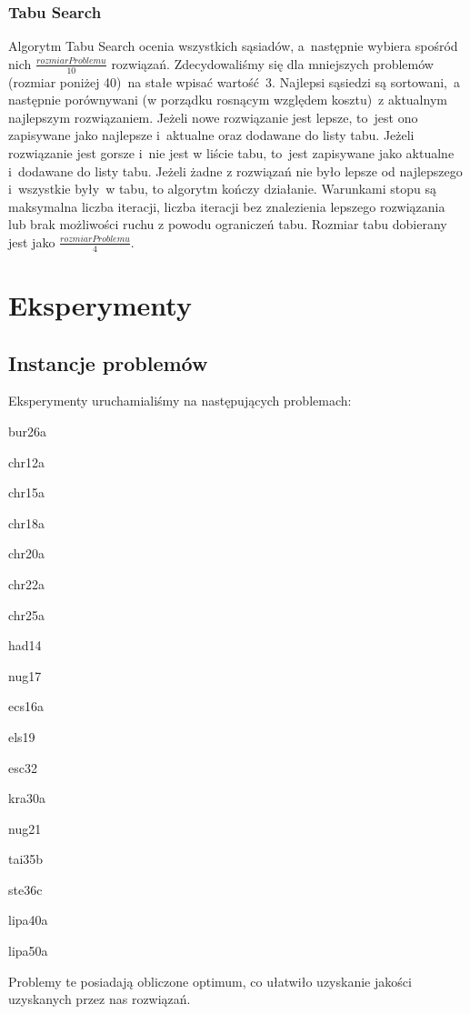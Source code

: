 \documentclass[a4paper,10pt]{article}
\begin{document}
\subsubsection{Tabu Search}
Algorytm Tabu Search ocenia wszystkich sąsiadów, a~następnie wybiera spośród nich $\frac{rozmiarProblemu}{10}$ rozwiązań. 
Zdecydowaliśmy się dla mniejszych problemów (rozmiar poniżej 40)~na stałe wpisać wartość~3.
Najlepsi sąsiedzi są sortowani,~a następnie porównywani (w porządku rosnącym względem kosztu)~z aktualnym najlepszym rozwiązaniem.
Jeżeli nowe rozwiązanie jest lepsze, to~jest ono zapisywane jako najlepsze i~aktualne oraz dodawane do listy tabu.
Jeżeli rozwiązanie jest gorsze i~nie jest w liście tabu, to~jest zapisywane jako aktualne i~dodawane do listy tabu.
Jeżeli żadne z rozwiązań nie było lepsze od najlepszego i~wszystkie były~w tabu, to algorytm kończy działanie.
Warunkami stopu są maksymalna liczba iteracji, liczba iteracji bez znalezienia lepszego rozwiązania lub brak możliwości ruchu z powodu ograniczeń tabu.
Rozmiar tabu dobierany jest jako $\frac{rozmiarProblemu}{4}$.

\section{Eksperymenty}
\subsection{Instancje problemów}
Eksperymenty uruchamialiśmy na następujących problemach:
\begin{tightenum}
\item bur26a
\item chr12a
\item chr15a
\item chr18a
\item chr20a
\item chr22a
\item chr25a
\item had14
\item nug17
\item ecs16a
\item els19
\item esc32
\item kra30a
\item nug21
\item tai35b
\item ste36c
\item lipa40a
\item lipa50a
\end{tightenum}
Problemy te posiadają obliczone optimum, co ułatwiło uzyskanie jakości uzyskanych przez nas rozwiązań.
\end{document}
